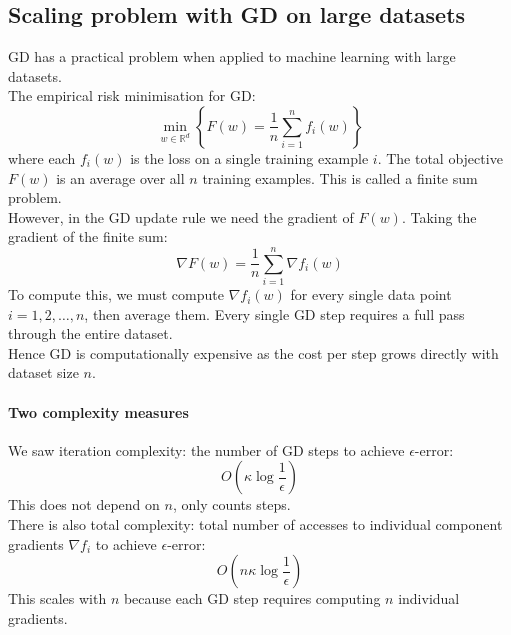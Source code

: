 \documentclass[../Probability.tex]{subfiles}
\begin{document}
\subsection{Scaling problem with GD on large datasets}
GD has a practical problem when applied to machine learning with large datasets.\\
The empirical risk minimisation for GD:
$$\min_{w \in \mathbb{R}^d} \left\{ F(w) = \frac{1}{n}\sum_{i=1}^{n} f_i(w) \right\}$$
where each $f_i(w)$ is the loss on a single training example $i$. The total objective $F(w)$ is an average over all $n$ training examples.
This is called a finite sum problem.\\
However, in the GD update rule we need the gradient of $F(w)$. Taking the gradient of the finite sum:
$$\nabla F(w) = \frac{1}{n}\sum_{i=1}^{n} \nabla f_i(w)$$
To compute this, we must compute $\nabla f_i(w)$ for every single data point $i = 1, 2, \ldots, n$, then average them. Every single GD step requires a full pass through the entire dataset.\\
Hence GD is computationally expensive as the cost per step grows directly with dataset size $n$.
\paragraph{Two complexity measures}
We saw iteration complexity: the number of GD steps to achieve $\epsilon$-error:
$$O\left(\kappa\log\frac{1}{\epsilon}\right)$$
This does not depend on $n$, only counts steps.\\
There is also total complexity: total number of accesses to individual component gradients $\nabla f_i$ to achieve $\epsilon$-error:
$$O\left(n\kappa\log\frac{1}{\epsilon}\right)$$
This scales with $n$ because each GD step requires computing $n$ individual gradients.
\end{document}
